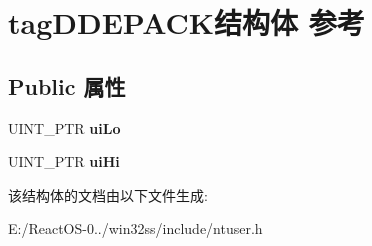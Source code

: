 \hypertarget{structtag_d_d_e_p_a_c_k}{}\section{tag\+D\+D\+E\+P\+A\+C\+K结构体 参考}
\label{structtag_d_d_e_p_a_c_k}
\subsection*{Public 属性}
\begin{DoxyCompactItemize}
\item 
\mbox{\label{structtag_d_d_e_p_a_c_k_ae6860473587ace3fb087ecdfb70f3f39}} 
U\+I\+N\+T\+\_\+\+P\+TR {\bfseries ui\+Lo}
\item 
\mbox{\label{structtag_d_d_e_p_a_c_k_a109e99cadb9f2f786fb8da95a739da77}} 
U\+I\+N\+T\+\_\+\+P\+TR {\bfseries ui\+Hi}
\end{DoxyCompactItemize}


该结构体的文档由以下文件生成\+:\begin{DoxyCompactItemize}
\item 
E\+:/\+React\+O\+S-\/0../win32ss/include/ntuser.\+h\end{DoxyCompactItemize}
